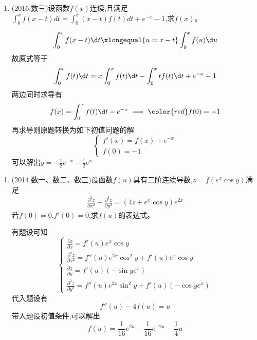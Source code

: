 \documentclass[12pt, a4paper, oneside, UTF8]{ctexbook}
\begin{document}
\begin{enumerate}[label=\arabic*.,start=20]
    \item (2016,数三)设函数$f(x)$连续,且满足$\int_0^x f(x-t)dt=\int_0^x(x-t)f(t)dt+e^{-x}-1$,求$f(x)$。
    
    \begin{solution}
    \begin{align*}
        \int_{0}^{x}f(x-t)\d t \xlongequal{u=x-t} \int_{0}^{x}f(u)\d u 
    \end{align*}
    故原式等于
    $$
    \int_{0}^{x}f(t)\d t=x\int_{0}^{x}f(t)\d t -\int_{0}^{x}tf(t)\d t + e^{-x} - 1
    $$
    两边同时求导有
    $$
    f(x)=\int_{0}^{x}f(t)\d t - e^{-x} \implies {\color{red} f(0)=-1}
    $$
    再求导则原题转换为如下初值问题的解
    $$
    \begin{cases}
        f'(x)=f(x)+e^{-x} \\
        f(0) = -1
    \end{cases}
    $$
    可以解出$\displaystyle y=-\frac{1}{2}e^{-x}-\frac{1}{2}e^{x}$
    \end{solution}
\end{enumerate}

\begin{enumerate}[label=\arabic*.,start=21]
    \item (2014,数一、数二、数三)设函数$f(u)$具有二阶连续导数,$z=f(e^x\cos y)$满足
    \begin{align*}
        \frac{\partial^2 z}{\partial x^2}+\frac{\partial^2 z}{\partial y^2}=(4z+e^x\cos y)e^{2x}
    \end{align*}
    若$f(0)=0$,$f'(0)=0$,求$f(u)$的表达式。
    
    \begin{solution}
    有题设可知
    $$
    \begin{cases}
        \frac{\partial z}{\partial x} = f'(u)e^x\cos{y} \\
        \frac{\partial^2 z}{\partial x^2} = f''(u)e^{2x}\cos^2{y}+f'(u)e^x\cos{y} \\
        \frac{\partial z}{\partial y} = f'(u)(-\sin{y}e^x) \\
        \frac{\partial^2 z}{\partial y^2} = f''(u)e^{2x}\sin^2{y}+f'(u)(-\cos{y}e^x)
    \end{cases}
    $$
    代入题设有 
    $$
    f''(u)-4f(u) = u
    $$
    带入题设初值条件,可以解出
    $$
    f(u)=\frac{1}{16}e^{2u}-\frac{1}{16}e^{-2u}-\frac{1}{4}u
    $$
    \end{solution}
\end{enumerate}
\end{document}
